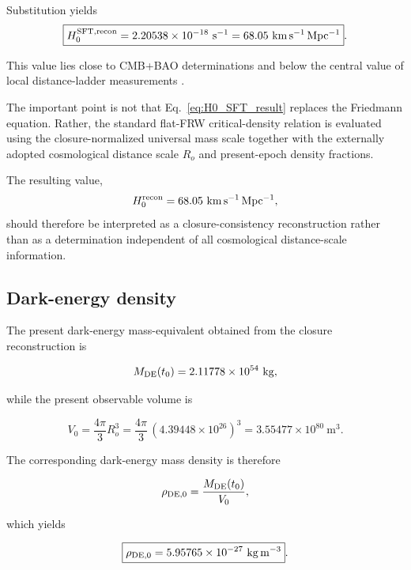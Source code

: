\documentclass[12pt]{article}
\begin{document}
Substitution yields
\begin{equation}
\boxed{
H_0^{\rm SFT,recon}
=
2.20538\times10^{-18}~\mathrm{s^{-1}}
=
68.05~\mathrm{km\,s^{-1}\,Mpc^{-1}}
}.
\end{equation}

This value lies close to CMB+BAO determinations and below the central value of
local distance-ladder measurements
\cite{Planck2020,DESI2024,Alam2021,Riess2022}.

The important point is not that
Eq.~\eqref{eq:H0_SFT_result}
replaces the Friedmann equation. Rather, the standard flat-FRW
critical-density relation is evaluated using the closure-normalized
universal mass scale together with the externally adopted cosmological
distance scale $R_o$ and present-epoch density fractions.

The resulting value,
\[
H_0^{\rm recon}
=
68.05~{\rm km\,s^{-1}\,Mpc^{-1}},
\]
should therefore be interpreted as a closure-consistency reconstruction
rather than as a determination independent of all cosmological
distance-scale information.



\subsection{Dark-energy density}
\label{subsec:DE_flat_noH0}

The present dark-energy mass-equivalent obtained from the closure
reconstruction is

\begin{equation}
M_{\rm DE}(t_0)
=
2.11778\times10^{54}
~\mathrm{kg},
\end{equation}

while the present observable volume is

\begin{equation}
V_0=\frac{4\pi}{3}R_o^3
=\frac{4\pi}{3}\,(4.39448\times10^{26})^3
= 3.55477\times10^{80}~\mathrm{m^{3}}.
\end{equation}

The corresponding dark-energy mass density is therefore

\begin{equation}
\rho_{\rm DE,0}
=
\frac{M_{\rm DE}(t_0)}{V_0},
\end{equation}

which yields

\begin{equation}
\boxed{
\rho_{\rm DE,0}
=
5.95765\times10^{-27}
~\mathrm{kg\,m^{-3}}
}.
\end{equation}
\end{document}

